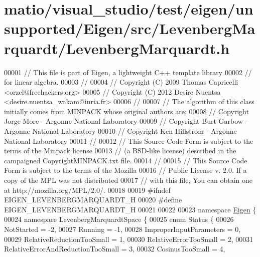 \hypertarget{matio_2visual__studio_2test_2eigen_2unsupported_2_eigen_2src_2_levenberg_marquardt_2_levenberg_marquardt_8h_source}{}\section{matio/visual\+\_\+studio/test/eigen/unsupported/\+Eigen/src/\+Levenberg\+Marquardt/\+Levenberg\+Marquardt.h}
\label{matio_2visual__studio_2test_2eigen_2unsupported_2_eigen_2src_2_levenberg_marquardt_2_levenberg_marquardt_8h_source}

\begin{DoxyCode}
00001 \textcolor{comment}{// This file is part of Eigen, a lightweight C++ template library}
00002 \textcolor{comment}{// for linear algebra.}
00003 \textcolor{comment}{//}
00004 \textcolor{comment}{// Copyright (C) 2009 Thomas Capricelli <orzel@freehackers.org>}
00005 \textcolor{comment}{// Copyright (C) 2012 Desire Nuentsa <desire.nuentsa\_wakam@inria.fr>}
00006 \textcolor{comment}{//}
00007 \textcolor{comment}{// The algorithm of this class initially comes from MINPACK whose original authors are:}
00008 \textcolor{comment}{// Copyright Jorge More - Argonne National Laboratory}
00009 \textcolor{comment}{// Copyright Burt Garbow - Argonne National Laboratory}
00010 \textcolor{comment}{// Copyright Ken Hillstrom - Argonne National Laboratory}
00011 \textcolor{comment}{//}
00012 \textcolor{comment}{// This Source Code Form is subject to the terms of the Minpack license}
00013 \textcolor{comment}{// (a BSD-like license) described in the campaigned CopyrightMINPACK.txt file.}
00014 \textcolor{comment}{//}
00015 \textcolor{comment}{// This Source Code Form is subject to the terms of the Mozilla}
00016 \textcolor{comment}{// Public License v. 2.0. If a copy of the MPL was not distributed}
00017 \textcolor{comment}{// with this file, You can obtain one at http://mozilla.org/MPL/2.0/.}
00018 
00019 \textcolor{preprocessor}{#ifndef EIGEN\_LEVENBERGMARQUARDT\_H}
00020 \textcolor{preprocessor}{#define EIGEN\_LEVENBERGMARQUARDT\_H}
00021 
00022 
00023 \textcolor{keyword}{namespace }\hyperlink{namespace_eigen}{Eigen} \{
00024 \textcolor{keyword}{namespace }LevenbergMarquardtSpace \{
00025     \textcolor{keyword}{enum} Status \{
00026         NotStarted = -2,
00027         Running = -1,
00028         ImproperInputParameters = 0,
00029         RelativeReductionTooSmall = 1,
00030         RelativeErrorTooSmall = 2,
00031         RelativeErrorAndReductionTooSmall = 3,
00032         CosinusTooSmall = 4,

\end{DoxyCode}
